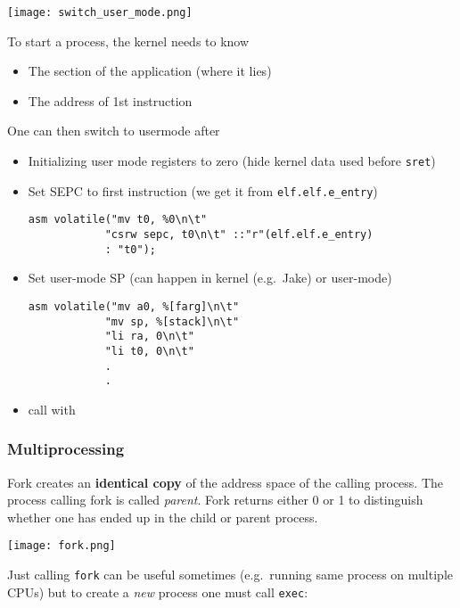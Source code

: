 \newpar{}
\begin{center}
    \texttt{[image: switch\_user\_mode.png]}
\end{center}
To start a process, the kernel needs to know
\begin{itemize}
    \item The  section of the application (where it lies)
    \item The address of 1st instruction
\end{itemize}
One can then switch to usermode after
\begin{itemize}
    \item Initializing user mode registers to zero (hide kernel data used before \texttt{sret})
    \item Set SEPC to first instruction (we get it from \texttt{elf.elf.e\_entry})
    \begin{lstlisting}[style=bright_C++]
    asm volatile("mv t0, %0\n\t"
            "csrw sepc, t0\n\t" ::"r"(elf.elf.e_entry)
            : "t0");
    \end{lstlisting}
    \item Set user-mode SP (can happen in kernel (e.g.\ Jake) or user-mode)
    \begin{lstlisting}[style=bright_C++]
    asm volatile("mv a0, %[farg]\n\t"
            "mv sp, %[stack]\n\t"
            "li ra, 0\n\t"
            "li t0, 0\n\t"
            .
            .
    \end{lstlisting}
    \item call  with 
\end{itemize}

\subsubsection{Multiprocessing}

\newpar{}

Fork creates an \textbf{identical copy} of the address space of the calling process. The process calling fork is called \textit{parent}. Fork returns either 0 or 1 to distinguish whether one has ended up in the child or parent process.
\begin{center}
    \texttt{[image: fork.png]}
\end{center}

Just calling \texttt{fork} can be useful sometimes (e.g.\ running same process on multiple CPUs) but to create a \textit{new} process one must call \texttt{exec}:

